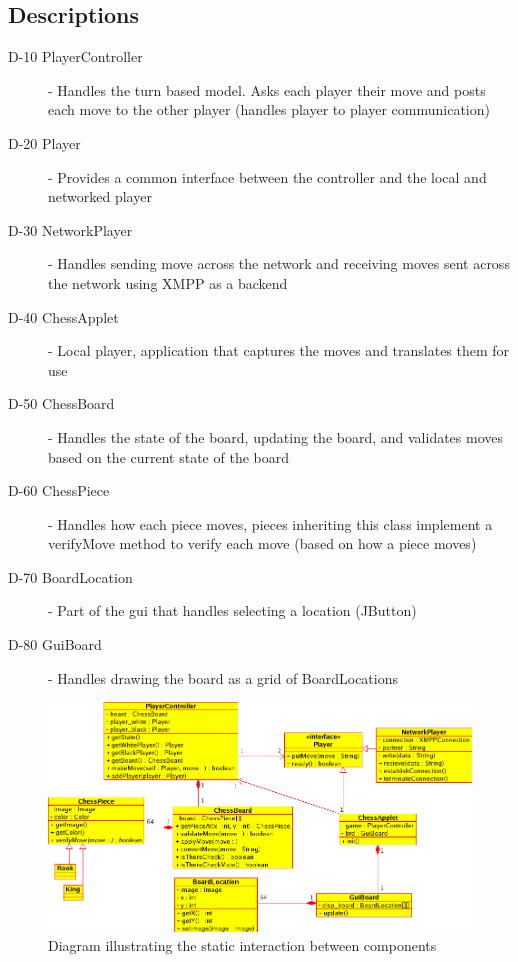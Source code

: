 \subsection{Descriptions}
\begin{description}
\item[D-10 PlayerController] - Handles the turn based model. Asks each player their move and posts each move to the other player (handles player to player communication)
\item[D-20 Player] - Provides a common interface between the controller and the local and networked player
\item[D-30 NetworkPlayer] - Handles sending move across the network and receiving moves sent across the network using XMPP as a backend
\item[D-40 ChessApplet] - Local player, application that captures the moves and translates them for use
\item[D-50 ChessBoard] - Handles the state of the board, updating the board, and validates moves based on the current state of the board
\item[D-60 ChessPiece] - Handles how each piece moves, pieces inheriting this class implement a verifyMove method to verify each move (based on how a piece moves)
\item[D-70 BoardLocation] - Part of the gui that handles selecting a location (JButton)
\item[D-80 GuiBoard] - Handles drawing the board as a grid of BoardLocations


\end{description}
\begin{figure}[H]
   \centering
   \includegraphics[angle=90,scale=0.85]{cdiagram.png}
   \caption{Diagram illustrating the static interaction between components}
  \end{figure}
